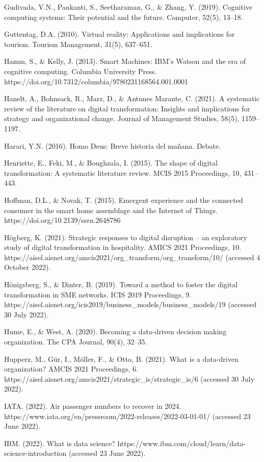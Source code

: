 \documentclass[
  letterpaper,
  DIV=11,
  numbers=noendperiod]{scrreprt}
\begin{document}
Gudivada, V.N., Pankanti, S., Seetharaman, G., \& Zhang, Y. (2019).
Cognitive computing systems: Their potential and the future. Computer,
52(5), 13--18.

Guttentag, D.A. (2010). Virtual reality: Applications and implications
for tourism. Tourism Management, 31(5), 637--651.

Hamm, S., \& Kelly, J. (2013). Smart Machines: IBM's Watson and the era
of cognitive computing. Columbia University Press.
https://doi.org/10.7312/columbia/9780231168564.001.0001

Hanelt, A., Bohnsack, R., Marz, D., \& Antunes Marante, C. (2021). A
systematic review of the literature on digital transformation: Insights
and implications for strategy and organizational change. Journal of
Management Studies, 58(5), 1159--1197.

Harari, Y.N. (2016). Homo Deus: Breve historia del mañana. Debate.

Henriette, E., Feki, M., \& Boughzala, I. (2015). The shape of digital
transformation: A systematic literature review. MCIS 2015 Proceedings,
10, 431--443.

Hoffman, D.L., \& Novak, T. (2015). Emergent experience and the
connected consumer in the smart home assemblage and the Internet of
Things. https://doi.org/10.2139/ssrn.2648786

Högberg, K. (2021). Strategic responses to digital disruption -- an
exploratory study of digital transformation in hospitality. AMICS 2021
Proceedings, 10.
https://aisel.aisnet.org/amcis2021/org\_transform/org\_transform/10/
(accessed 4 October 2022).

Hönigsberg, S., \& Dinter, B. (2019). Toward a method to foster the
digital transformation in SME networks. ICIS 2019 Proceedings, 9.
https://aisel.aisnet.org/icis2019/business\_models/business\_models/19
(accessed 30 July 2022).

Hume, E., \& West, A. (2020). Becoming a data-driven decision making
organization. The CPA Journal, 90(4), 32--35.

Hupperz, M., Gür, I., Möller, F., \& Otto, B. (2021). What is a
data-driven organization? AMCIS 2021 Proceedings, 6.
https://aisel.aisnet.org/amcis2021/strategic\_is/strategic\_is/6
(accessed 30 July 2022).

IATA. (2022). Air passenger numbers to recover in 2024.
https://www.iata.org/en/pressroom/2022-releases/2022-03-01-01/ (accessed
23 June 2022).

IBM. (2022). What is data science?
https://www.ibm.com/cloud/learn/data-science-introduction (accessed 23
June 2022).
\end{document}
